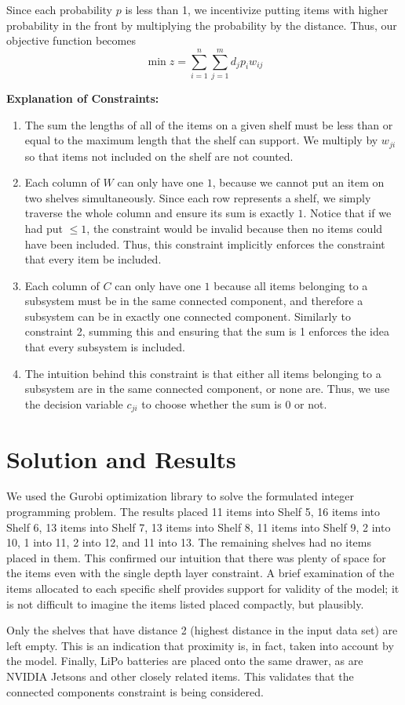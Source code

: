 \documentclass[10pt]{article}
\theoremstyle{named}
\begin{document}
Since each probability $p$ is less than 1, we incentivize putting items with higher probability
in the front by multiplying the probability by the distance. Thus, our objective function
becomes
$$\min z = \sum_{i = 1}^{n}\sum_{j = 1}^{m} d_j p_i w_{ij}$$

\textbf{Explanation of Constraints:}
\begin{enumerate}
\item The sum the lengths of all of the items on a given shelf must be less than or equal to
  the maximum length that the shelf can support. We multiply by $w_{ji}$ so that
  items not included on the shelf are not counted.
\item Each column of $W$ can only have one $1$, because we cannot put an item
  on two shelves simultaneously. Since each row represents a shelf, we simply
  traverse the whole column and ensure its sum is exactly $1$. Notice that if
  we had put $\leq 1$, the constraint would be invalid because then
  no items could have been included. Thus, this constraint implicitly enforces
  the constraint that every item be included.
\item Each column of $C$ can only have one $1$ because all items belonging to
  a subsystem must be in the same connected component, and therefore a subsystem
  can be in exactly one connected component. Similarly to constraint 2, summing
  this and ensuring that the sum is 1 enforces the idea that every subsystem is
  included.
\item The intuition behind this constraint is that either all items belonging
  to a subsystem are in the same connected component, or none are. Thus, we
  use the decision variable $c_{ji}$ to choose whether the sum is $0$ or not.
\end{enumerate}

\section{Solution and Results}
We used the Gurobi optimization library to solve the formulated integer programming
problem. The results placed 11 items into Shelf 5, 16 items into Shelf 6, 13 items
into Shelf 7, 13 items into Shelf 8, 11 items into Shelf 9, 2 into 10, 1 into 11,
2 into 12, and 11 into 13. The remaining shelves had no items placed in them.
This confirmed our intuition that there was plenty of space for the items
even with the single depth layer constraint. A brief examination of the items
allocated to each specific shelf provides support for validity of the model;
it is not difficult to imagine the items listed placed compactly, but plausibly.
\par
Only the shelves that have distance 2 (highest distance in the input data set)
are left empty. This is an indication that proximity is, in fact, taken into
account by the model. Finally, LiPo batteries are placed onto the same drawer,
as are NVIDIA Jetsons and other closely related items. This validates that the
connected components constraint is being considered.
\end{document}
